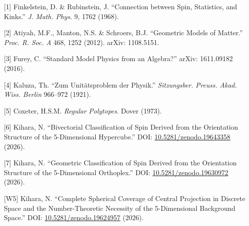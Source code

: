 \documentclass[
  a4paper,11pt]{article}
\theoremstyle{definition}
\theoremstyle{remark}
\begin{document}
{[}1{]} Finkelstein, D. \& Rubinstein, J. ``Connection between Spin,
Statistics, and Kinks.'' \emph{J. Math. Phys.} 9, 1762 (1968).

{[}2{]} Atiyah, M.F., Manton, N.S. \& Schroers, B.J. ``Geometric Models
of Matter.'' \emph{Proc. R. Soc. A} 468, 1252 (2012). arXiv: 1108.5151.

{[}3{]} Furey, C. ``Standard Model Physics from an Algebra?'' arXiv:
1611.09182 (2016).

{[}4{]} Kaluza, Th. ``Zum Unitätsproblem der Physik.''
\emph{Sitzungsber. Preuss. Akad. Wiss. Berlin} 966--972 (1921).

{[}5{]} Coxeter, H.S.M. \emph{Regular Polytopes}. Dover (1973).

{[}6{]} Kihara, N. ``Bivectorial Classification of Spin Derived from the
Orientation Structure of the 5-Dimensional Hypercube.'' DOI:
\href{https://doi.org/10.5281/zenodo.19643358}{10.5281/zenodo.19643358}
(2026).

{[}7{]} Kihara, N. ``Geometric Classification of Spin Derived from the
Orientation Structure of the 5-Dimensional Orthoplex.'' DOI:
\href{https://doi.org/10.5281/zenodo.19630972}{10.5281/zenodo.19630972}
(2026).

{[}W5{]} Kihara, N. ``Complete Spherical Coverage of Central Projection
in Discrete Space and the Number-Theoretic Necessity of the
5-Dimensional Background Space.'' DOI:
\href{https://doi.org/10.5281/zenodo.19624957}{10.5281/zenodo.19624957}
(2026).
\end{document}
